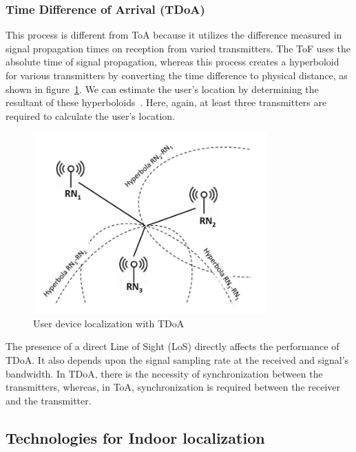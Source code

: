 \documentclass[a4paper,singleside,12pt]{report} %
\begin{document}
				\subsubsection{Time Difference of Arrival (TDoA)}
					This process is different from ToA because it utilizes the difference measured in signal propagation times on reception from varied transmitters. 
					The ToF uses the absolute time of signal propagation, whereas this process creates a hyperboloid for various transmitters by converting the time difference to physical distance, as shown in figure~\ref{fig2.4}. 
					We can estimate the user's location by determining the resultant of these hyperboloids~\cite{liu2007survey}. 
					Here, again, at least three transmitters are required to calculate the user's location.

					\begin{figure}[!htb]
					\centerline{\includegraphics[width=0.8\textwidth]{./figures/TDoA-indoor-localization.png}}
					\caption{User device localization with TDoA}
					\label{fig2.4}
					\end{figure}
					
					The presence of a direct Line of Sight (LoS) directly affects the performance of TDoA. 
					It also depends upon the signal sampling rate at the received and signal's bandwidth. 
					In TDoA, there is the necessity of synchronization between the transmitters, whereas, in ToA, synchronization is required between the receiver and the transmitter.


			\subsection{Technologies for Indoor localization}
\end{document}
